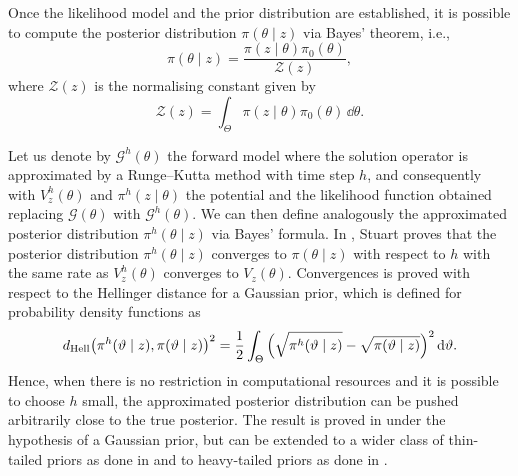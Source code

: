 \documentclass[10pt]{article}
\begin{document}
Once the likelihood model and the prior distribution are established, it is possible to compute the posterior distribution $\pi(\theta \mid z)$ via Bayes' theorem, i.e.,
\begin{equation}
	\pi(\theta\mid z) = \frac{\pi(z\mid \theta)\pi_0(\theta)}{\mathcal Z(z)},
\end{equation}
where $\mathcal Z(z)$ is the normalising constant given by
\begin{equation}
	\mathcal Z(z) = \int_{\Theta} \pi(z\mid \theta) \pi_0(\theta) \, \dd \theta.
\end{equation}

Let us denote by $\mathcal{G}^h(\theta)$ the forward model where the solution operator is approximated by a Runge--Kutta method with time step $h$, and consequently with $V^h_z(\theta)$ and $\pi^h(z\mid\theta)$ the potential and the likelihood function obtained replacing $\mathcal{G}(\theta)$ with $\mathcal{G}^h(\theta)$. We can then define analogously the approximated posterior distribution $\pi^h(\theta \mid z)$ via Bayes' formula. In \cite[Theorem 4.6]{Stu10}, Stuart proves that the posterior distribution $\pi^h(\theta\mid z)$ converges to $\pi(\theta\mid z)$ with respect to $h$ with the same rate as $V^h_z(\theta)$ converges to $V_z(\theta)$. Convergences is proved with respect to the Hellinger distance for a Gaussian prior, which is defined for probability density functions as
\begin{equation}
	d_{\mathrm{Hell}}\big(\pi^h(\vartheta\mid z), \pi(\vartheta\mid z)\big)^2 = \frac{1}{2}\int_{\Theta} \Big(\sqrt{\pi^h(\vartheta\mid z)} - \sqrt{\pi(\vartheta\mid z)}\Big)^2 \, \mathrm{d} \vartheta.
\end{equation}
Hence, when there is no restriction in computational resources and it is possible to choose $h$ small, the approximated posterior distribution can be pushed arbitrarily close to the true posterior. The result is proved in \cite{Stu10} under the hypothesis of a Gaussian prior, but can be extended to a wider class of thin-tailed priors as done in \cite{DaS16} and to heavy-tailed priors as done in \cite{Sul17}.
\end{document}

